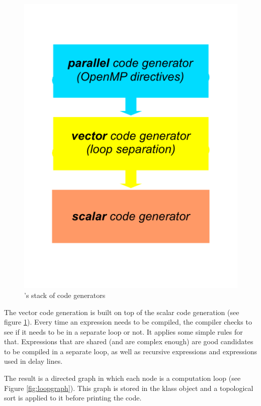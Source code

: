 \documentclass[a4paper]{book}
\begin{document}
\begin{figure}[htb]
  \centering
  \includegraphics[scale=0.75]{images/compiler-stack}
  \caption{\faust's stack of code generators}   
  \label{fig:stack}
\end{figure}


The vector code generation is built on top of the scalar code generation (see figure \ref{fig:stack}). Every time an expression needs to be compiled, the compiler checks to see if it needs to be in a separate loop or not. It applies some simple rules for that. Expressions that are shared (and are complex enough) are good candidates to be compiled in a separate loop, as well as recursive expressions and expressions used in delay lines. 

The result is a directed graph in which each node is a computation loop (see Figure \ref{fig:loopgraph}). This graph is stored in the klass object and a topological sort is applied to it before printing the code. 
\end{document}
